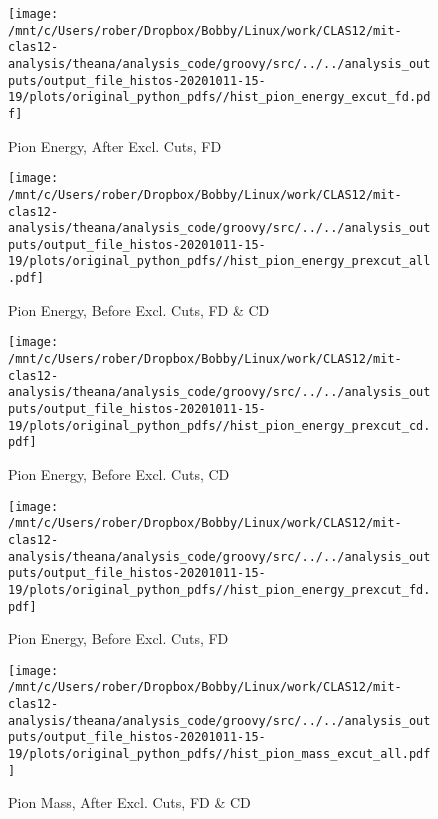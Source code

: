 \documentclass{article}
\begin{document}
\begin{landscape}
    \begin{figure}[h]
        \centering

        \texttt{[image: /mnt/c/Users/rober/Dropbox/Bobby/Linux/work/CLAS12/mit-clas12-analysis/theana/analysis\_code/groovy/src/../../analysis\_outputs/output\_file\_histos-20201011-15-19/plots/original\_python\_pdfs//hist\_pion\_energy\_excut\_fd.pdf]}
        \captionsetup{textformat=empty,labelformat=blank}
        \caption{Pion Energy, After Excl. Cuts, FD}
    \end{figure}
    \clearpage
    
    \begin{figure}[h]
        \centering

        \texttt{[image: /mnt/c/Users/rober/Dropbox/Bobby/Linux/work/CLAS12/mit-clas12-analysis/theana/analysis\_code/groovy/src/../../analysis\_outputs/output\_file\_histos-20201011-15-19/plots/original\_python\_pdfs//hist\_pion\_energy\_prexcut\_all.pdf]}
        \captionsetup{textformat=empty,labelformat=blank}
        \caption{Pion Energy, Before Excl. Cuts, FD \& CD}
    \end{figure}
    \clearpage
    
    \begin{figure}[h]
        \centering

        \texttt{[image: /mnt/c/Users/rober/Dropbox/Bobby/Linux/work/CLAS12/mit-clas12-analysis/theana/analysis\_code/groovy/src/../../analysis\_outputs/output\_file\_histos-20201011-15-19/plots/original\_python\_pdfs//hist\_pion\_energy\_prexcut\_cd.pdf]}
        \captionsetup{textformat=empty,labelformat=blank}
        \caption{Pion Energy, Before Excl. Cuts, CD}
    \end{figure}
    \clearpage
    
    \begin{figure}[h]
        \centering

        \texttt{[image: /mnt/c/Users/rober/Dropbox/Bobby/Linux/work/CLAS12/mit-clas12-analysis/theana/analysis\_code/groovy/src/../../analysis\_outputs/output\_file\_histos-20201011-15-19/plots/original\_python\_pdfs//hist\_pion\_energy\_prexcut\_fd.pdf]}
        \captionsetup{textformat=empty,labelformat=blank}
        \caption{Pion Energy, Before Excl. Cuts, FD}
    \end{figure}
    \clearpage
    
    \begin{figure}[h]
        \centering

        \texttt{[image: /mnt/c/Users/rober/Dropbox/Bobby/Linux/work/CLAS12/mit-clas12-analysis/theana/analysis\_code/groovy/src/../../analysis\_outputs/output\_file\_histos-20201011-15-19/plots/original\_python\_pdfs//hist\_pion\_mass\_excut\_all.pdf]}
        \captionsetup{textformat=empty,labelformat=blank}
        \caption{Pion Mass, After Excl. Cuts, FD \& CD}
    \end{figure}
    \clearpage
    

\end{landscape}
\end{document}
